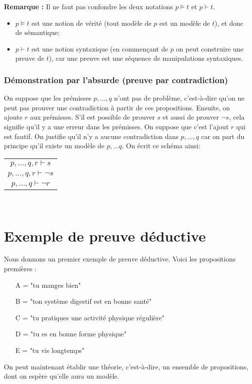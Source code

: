 			\textbf{Remarque :} Il ne faut pas confondre les deux notations $p\models t$ et $p\vdash t$.
			\begin{itemize}
			\item $p\models t$ est une notion de vérité (tout modèle de $p$ est un modèle de $t$), et donc de sémantique;
			\item $ p\vdash t$ est une notion syntaxique (en commençant de $p$ on peut construire une preuve de $t$),
car une preuve est une séquence de manipulations syntaxiques.
			\end{itemize}
			
\subsubsection*{Démonstration par l'absurde (preuve par contradiction)}
		On suppose que les prémisses $p, ..., q$ n'ont pas de problème,
c'est-à-dire qu'on ne peut pas prouver une contradiction à partir de ces propositions.
Ensuite, on ajoute $r$ aux prémisses.
S'il est possible de prouver $s$ et aussi de prouver $\lnot s$, cela signifie qu'il y a une erreur dans les prémisses.
On suppose que c'est l'ajout $r$ qui est fautif.
On justifie qu'il n'y a aucune contradiction dans $p, ... ,q$ car on part du principe qu'il existe un modèle de $p,...q$.
On écrit ce schéma ainsi:
		\begin{center}
			\begin{tabular}{c}
      		$p,...,q,r \vdash s$ \\
      		$p,...,q,r \vdash \lnot s$\\
      		\hline
      		$p,...,q \vdash \lnot r$\\
   			\end{tabular}\\
			\end{center}
			
\section{Exemple de preuve déductive}

Nous donnons un premier exemple de preuve déductive.
Voici les propositions premières :
\begin{enumerate}
\item[A =] "tu manges bien"
\item[B =] "ton système digestif est en bonne santé"
\item[C =] "tu pratiques une activité physique régulière"
\item[D =] "tu es en bonne forme physique"
\item[E =] "tu vis longtemps"
\end{enumerate}
On peut maintenant établir une théorie, c'est-à-dire, un ensemble de propositions,
dont on espère qu'elle aura un modèle.

